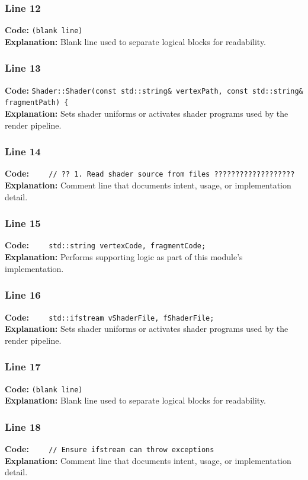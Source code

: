 \documentclass[11pt,a4paper]{article}
\begin{document}
\subsubsection*{Line 12}
\textbf{Code:} \texttt{(blank line)}\\
\textbf{Explanation:} Blank line used to separate logical blocks for readability.

\subsubsection*{Line 13}
\textbf{Code:} \verb|Shader::Shader(const std::string& vertexPath, const std::string& fragmentPath) {|\\
\textbf{Explanation:} Sets shader uniforms or activates shader programs used by the render pipeline.

\subsubsection*{Line 14}
\textbf{Code:} \verb|    // ?? 1. Read shader source from files ???????????????????|\\
\textbf{Explanation:} Comment line that documents intent, usage, or implementation detail.

\subsubsection*{Line 15}
\textbf{Code:} \verb|    std::string vertexCode, fragmentCode;|\\
\textbf{Explanation:} Performs supporting logic as part of this module's implementation.

\subsubsection*{Line 16}
\textbf{Code:} \verb|    std::ifstream vShaderFile, fShaderFile;|\\
\textbf{Explanation:} Sets shader uniforms or activates shader programs used by the render pipeline.

\subsubsection*{Line 17}
\textbf{Code:} \texttt{(blank line)}\\
\textbf{Explanation:} Blank line used to separate logical blocks for readability.

\subsubsection*{Line 18}
\textbf{Code:} \verb|    // Ensure ifstream can throw exceptions|\\
\textbf{Explanation:} Comment line that documents intent, usage, or implementation detail.
\end{document}
